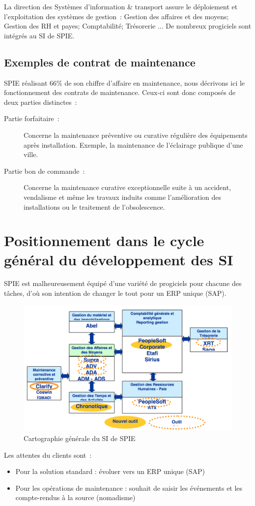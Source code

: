 La direction des Systèmes d’information \& transport assure le déploiement et l’exploitation des systèmes de
gestion~: Gestion des affaires et des moyens; Gestion des RH et payes; Comptabilité; Trésorerie ... De nombreux
progiciels sont intégrés au SI de SPIE.

\subsection{Exemples de contrat de maintenance}

SPIE réalisant 66\% de son chiffre d'affaire en maintenance, nous décrivons ici le fonctionnement des contrats de
maintenance. Ceux-ci sont donc composés de deux parties distinctes~:

\begin{description}
    \item[Partie forfaitaire~:] Concerne la maintenance préventive ou curative régulière des équipements
    après installation. Exemple, la maintenance de l'éclairage publique d'une ville.

    \item[Partie bon de commande~:] Concerne la maintenance curative exceptionnelle suite à un accident, vendalisme et
    même les travaux induits comme l'amélioration des installations ou le traitement de l’obsolescence.
\end{description}


\pagebreak
\section{Positionnement dans le cycle général du développement des SI}

SPIE est malheureusement équipé d'une variété de progiciels pour chacune des tâches, d'où son intention
de changer le tout pour un ERP unique (SAP).

\begin{figure}[h]
    \centering
    \includegraphics[width=140mm]{A_SI_actuelles.png}
    \caption{Cartographie générale du SI de SPIE}
    \label{diagram:si_map}
\end{figure}

Les attentes du clients sont~:

\begin{itemize}
    \item Pour la solution standard : évoluer vers un ERP unique (SAP)
    \item Pour les opérations de maintenance : souhait de saisir les événements et les compte-rendus à la
    source (nomadisme)
\end{itemize}

